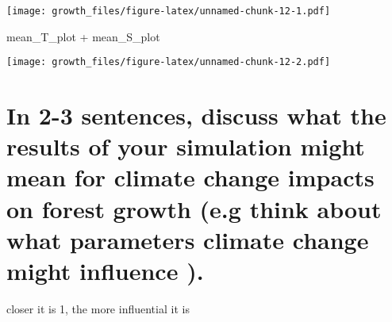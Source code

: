 \documentclass[
]{article}
\newenvironment{Shaded}{\begin{snugshade}}{\end{snugshade}}
\newcommand{\NormalTok}[1]{#1}
\newcommand{\SpecialCharTok}[1]{\textcolor[rgb]{0.00,0.00,0.00}{#1}}
\begin{document}
\texttt{[image: growth\_files/figure-latex/unnamed-chunk-12-1.pdf]}

\begin{Shaded}
\begin{Highlighting}[]
\NormalTok{mean\_T\_plot }\SpecialCharTok{+}\NormalTok{ mean\_S\_plot}
\end{Highlighting}
\end{Shaded}

\texttt{[image: growth\_files/figure-latex/unnamed-chunk-12-2.pdf]}

\hypertarget{in-2-3-sentences-discuss-what-the-results-of-your-simulation-might-mean-for-climate-change-impacts-on-forest-growth-e.g-think-about-what-parameters-climate-change-might-influence-.}{%
\section{In 2-3 sentences, discuss what the results of your simulation
might mean for climate change impacts on forest growth (e.g think about
what parameters climate change might influence
).}\label{in-2-3-sentences-discuss-what-the-results-of-your-simulation-might-mean-for-climate-change-impacts-on-forest-growth-e.g-think-about-what-parameters-climate-change-might-influence-.}}

closer it is 1, the more influential it is
\end{document}
